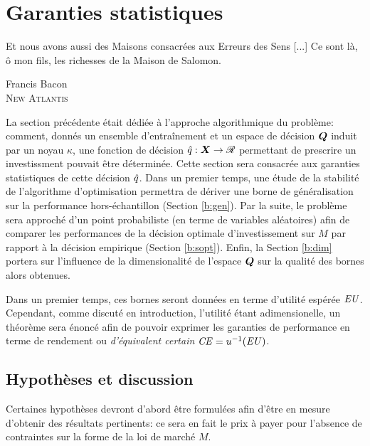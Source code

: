 \section{Garanties statistiques}
\label{sec:bound}

\epigraph{Et nous avons aussi des Maisons consacrées aux Erreurs des Sens [...] Ce sont là, ô
  mon fils, les richesses de la Maison de Salomon.}{Francis Bacon\\\textsc{New Atlantis}}



La section précédente était dédiée à l'approche algorithmique du problème: comment, donnés
un ensemble d'entraînement et un espace de décision $\bm Q$ induit par un noyau $\kappa$, une
fonction de décision $\hat q:\bm{X} \to \mathscr{R}$ permettant de prescrire un investissment pouvait être
déterminée. Cette section sera consacrée aux garanties statistiques de cette
décision $\hat q$. Dans un premier temps, une étude de la stabilité de l'algorithme d'optimisation
permettra de dériver une borne de généralisation sur la performance hors-échantillon
(Section \ref{b:gen}). Par la suite, le problème sera approché d'un point probabiliste (en
terme de variables aléatoires) afin de comparer les performances de la décision optimale
d'investissement sur $M$ par rapport à la décision empirique (Section
\ref{b:sopt}). Enfin, la Section \ref{b:dim} portera sur l'influence de la dimensionalité
de l'espace $\bm Q$ sur la qualité des bornes alors obtenues. 

Dans un premier temps, ces bornes seront données en terme d'utilité espérée
$\operatorname{\mbox{\textit{EU}}}$. Cependant, comme discuté en introduction, l'utilité étant adimensionelle, un
théorème sera énoncé afin de pouvoir exprimer les garanties de performance en terme de
rendement ou \textit{d'équivalent certain} $\operatorname{\mbox{\textit{CE}}} = u^{-1}(\operatorname{\mbox{\textit{EU}}})$. 


\subsection{Hypothèses et discussion}

Certaines hypothèses devront d'abord être formulées afin d'être en mesure d'obtenir des
résultats pertinents: ce sera en fait le prix à payer pour l'absence de contraintes sur la
forme de la loi de marché $M$.


